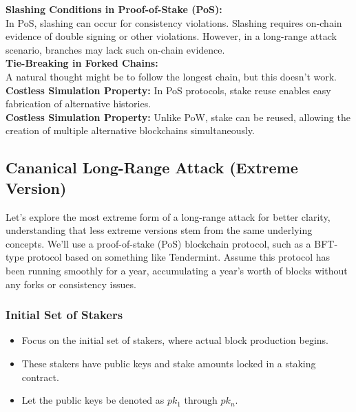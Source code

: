 \noindent
\textbf{Slashing Conditions in Proof-of-Stake (PoS):}\\
In PoS, slashing can occur for consistency violations.
Slashing requires on-chain evidence of double signing or other violations.
However, in a long-range attack scenario, branches may lack such on-chain evidence.\\

\noindent
\textbf{Tie-Breaking in Forked Chains:}\\
A natural thought might be to follow the longest chain, but this doesn't work.\\
\textbf{Costless Simulation Property:} In PoS protocols, stake reuse enables easy fabrication of alternative histories.\\
\textbf{Costless Simulation Property:} Unlike PoW, stake can be reused, allowing the creation of multiple alternative blockchains simultaneously.


\subsection{Cananical Long-Range Attack (Extreme Version)}
Let's explore the most extreme form of a long-range attack for better clarity, understanding that less extreme versions stem from the same underlying concepts. We'll use a proof-of-stake (PoS) blockchain protocol, such as a BFT-type protocol based on something like Tendermint. Assume this protocol has been running smoothly for a year, accumulating a year's worth of blocks without any forks or consistency issues.

\subsubsection{Initial Set of Stakers}
\begin{itemize}
    \item Focus on the initial set of stakers, where actual block production begins.
    \item These stakers have public keys and stake amounts locked in a staking contract.
    \item Let the public keys be denoted as $pk_1$ through $pk_n$.
\end{itemize}

